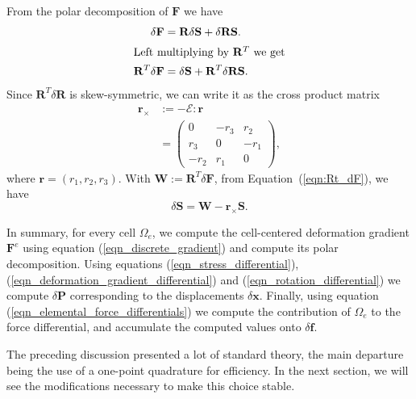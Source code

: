 From the polar decomposition of $\mathbf{F}$ we have
\begin{align}
\delta\mathbf{F} &= \mathbf{R}\delta\mathbf{S}
+ \delta \mathbf{R}\mathbf{S}.\nonumber\\
\intertext{Left multiplying by $\mathbf{R}^T$ we get}
\mathbf{R}^T\delta\mathbf{F} &= \delta\mathbf{S}
+ \mathbf{R}^T\delta \mathbf{R}\mathbf{S}.\label{eqn:Rt_dF}
\end{align}
Since $\mathbf{R}^T\delta\mathbf{R}$ is skew-symmetric, we can write
it as the cross product matrix 
\begin{align*}
\mathbf{r}_\times &:= -\mathcal{E}:\mathbf{r}\\
                  &=\left(\begin{array}{ccc}
                  0 & -r_3 & r_2\\
                  r_3& 0 & -r_1\\
                  -r_2 & r_1 & 0\end{array}\right),
\end{align*} 
where $\mathbf{r}= (r_1,r_2,r_3)$. With
$\mathbf{W}:=\mathbf{R}^T\delta\mathbf{F}$, from
Equation~(\ref{eqn:Rt_dF}), we have
\begin{equation*}
\delta\mathbf{S} = \mathbf{W}-\mathbf{r}_\times\mathbf{S}.
\end{equation*}



In summary, for every cell $\Omega_e$, we compute the cell-centered deformation gradient $\mathbf{F}^e$ using
equation (\ref{eqn_discrete_gradient}) and compute its polar decomposition. Using equations (\ref{eqn_stress_differential}), (\ref{eqn_deformation_gradient_differential}) and
(\ref{eqn_rotation_differential}) we compute $\delta\mathbf{P}$ corresponding to the displacements $\delta\mathbf{x}$. Finally, using equation
(\ref{eqn_elemental_force_differentials}) we compute the contribution of $\Omega_e$ to the force differential, and accumulate the computed values onto $\delta\mathbf{f}$.

The preceding discussion presented a lot of standard theory, the main departure
being the use of a one-point quadrature for efficiency. In the next section, we
will see the modifications necessary to make this choice stable.
